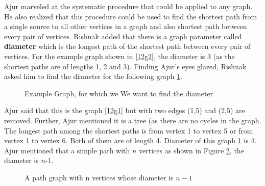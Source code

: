 Ajur marveled at the systematic procedure that could be applied to any graph. He also realized that this procedure could be used to find the shortest path from a single source to all other vertices in a graph and also shortest path between every pair of vertices. Rishnak added that there is a graph parameter called \textbf{diameter} which is the longest path of the shortest path between every pair of vertices. For the example graph shown in \ref{12g2}, the diameter is 3 (as the shortest paths are of lengths 1, 2 and 3). Finding Ajur's eyes glazed, Rishnak asked him to find the diameter for the following graph \ref{12g3}.  

\begin{figure}
\begin{center}
\caption{ Example Graph, for which we We want to find the diameter }\label{12g3}
\end{center}
\end{figure}

Ajur said that this is the graph \ref{12g1} but with two edges (1,5) and (2,5) are removed. Further, Ajur mentioned it is a tree (as there are no cycles in the graph. The longest path among the shortest paths is from vertex 1 to vertex 5 or from vertex 1 to vertex 6. Both of them are of length 4. Diameter of this graph \ref{12g3} is 4. Ajur mentioned that a simple path with $n$ vertices as shown in Figure \ref{12g4}, the diameter is $n$-1.

\begin{figure}
\begin{center}
\caption{ A path graph with n vertices whose diameter is $n-1$ }\label{12g4}
\end{center}
\end{figure}


